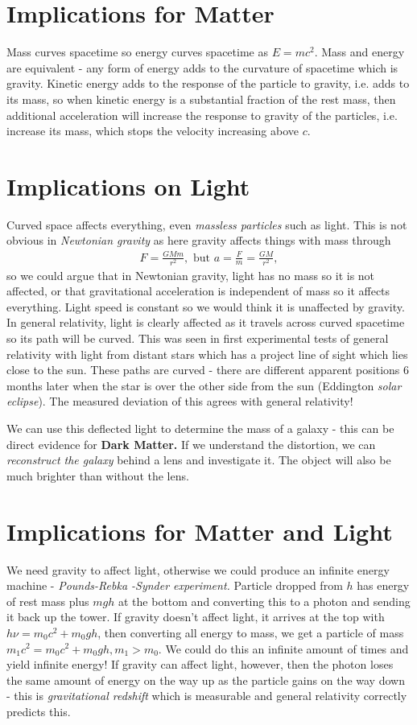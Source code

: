 \documentclass[a4paper, 11pt, normalem]{report}
\begin{document}
\section{Implications for Matter}
Mass curves spacetime so energy curves spacetime as $E=mc^2$.
Mass and energy are equivalent - any form of energy adds to the curvature of spacetime which is gravity.
Kinetic energy adds to the response of the particle to gravity, i.e. adds to its mass, so when kinetic energy is a substantial fraction of the rest mass, then additional acceleration will increase the response to gravity of the particles, i.e. increase its mass, which stops the velocity increasing above $c$.

\section{Implications on Light}
Curved space affects everything, even \emph{massless particles} such as light. 
This is not obvious in \emph{Newtonian gravity} as here gravity affects things with mass through
\begin{align}
    F = \frac{GMm}{r^2},\text{ but } a = \frac{F}{m}=\frac{GM}{r^2},
\end{align}
so we could argue that in Newtonian gravity, light has no mass so it is not affected, or that gravitational acceleration is independent of mass so it affects everything. 
Light speed is constant so we would think it is unaffected by gravity. 
In general relativity, light is clearly affected as it travels across curved spacetime so its path will be curved. 
This was seen in first experimental tests of general relativity with light from distant stars which has a project line of sight which lies close to the sun. 
These paths are curved - there are different apparent positions 6 months later when the star is over the other side from the sun (Eddington \emph{solar eclipse}).
The measured deviation of this agrees with general relativity!

We can use this deflected light to determine the mass of a galaxy - this can be direct evidence for \textbf{Dark Matter.}
If we understand the distortion, we can \emph{reconstruct the galaxy} behind a lens and investigate it. 
The object will also be much brighter than without the lens. 

\section{Implications for Matter and Light}
We need gravity to affect light, otherwise we could produce an infinite energy machine - \emph{Pounds-Rebka -Synder experiment.}
Particle dropped from $h$ has energy of rest mass plus $mgh$ at the bottom and converting this to a photon and sending it back up the tower.
If gravity doesn't affect light, it arrives at the top with $h\nu=m_0c^2+m_0gh$, then converting all energy to mass, we get a particle of mass $m_1c^2 = m_0c^2+m_0gh,m_1>m_0$.
We could do this an infinite amount of times and yield infinite energy!
If gravity can affect light, however, then the photon loses the same amount of energy on the way up as the particle gains on the way down - this is \emph{gravitational redshift} which is measurable and general relativity correctly predicts this. 
\end{document}

